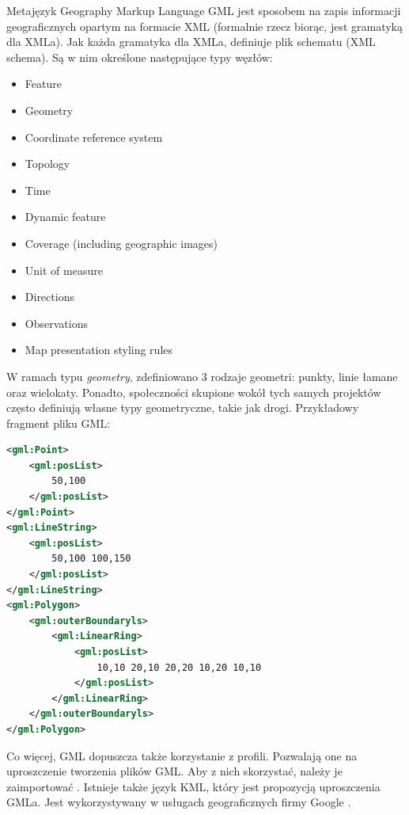Metajęzyk Geography Markup Language GML jest sposobem na zapis informacji geograficznych opartym na formacie XML (formalnie rzecz biorąc, jest gramatyką dla XMLa).
Jak każda gramatyka dla XMLa, definiuje plik schematu (XML schema). Są w nim określone następujące typy węzłów:
\begin{itemize}
    \item Feature
    \item Geometry
    \item Coordinate reference system
    \item Topology
    \item Time
    \item Dynamic feature
    \item Coverage (including geographic images)
    \item Unit of measure
    \item Directions
    \item Observations
    \item Map presentation styling rules
\end{itemize}

W ramach typu \textit{geometry}, zdefiniowano 3 rodzaje geometri: punkty, linie łamane oraz wielokaty.
Ponadto, społeczności skupione wokół tych samych projektów często definiują własne typy geometryczne, takie jak drogi.
Przykładowy fragment pliku GML:

\begin{lstlisting}[frame=L, language=xml]
<gml:Point>
    <gml:posList>
        50,100
    </gml:posList>
</gml:Point>
<gml:LineString>
    <gml:posList>
        50,100 100,150
    </gml:posList>
</gml:LineString>
<gml:Polygon>
    <gml:outerBoundaryls>
        <gml:LinearRing>
            <gml:posList>
                10,10 20,10 20,20 10,20 10,10
            </gml:posList>
        </gml:LinearRing>
    </gml:outerBoundaryls>
</gml:Polygon>
\end{lstlisting}

Co więcej, GML dopuszcza także korzystanie z profili. Pozwalają one na uproszczenie tworzenia plików GML. Aby z nich skorzystać, należy je zaimportować \cite{OpeGIS_GML2007}.
Istnieje także język KML, który jest propozycją uproszczenia GMLa. Jest wykorzystywany w usługach geograficznych firmy Google \cite{kulawiak2014}.

